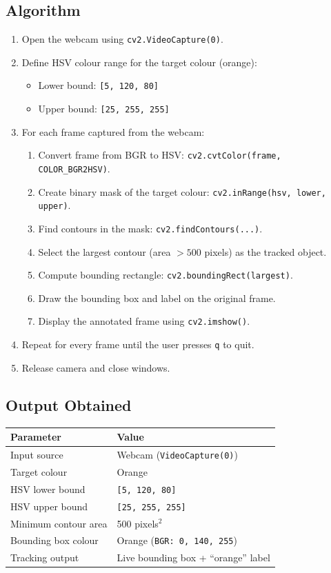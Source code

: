 \documentclass[12pt,a4paper]{article}
\begin{document}
\subsection*{Algorithm}
\begin{enumerate}[leftmargin=*, label=\arabic*.]
  \item Open the webcam using \texttt{cv2.VideoCapture(0)}.
  \item Define HSV colour range for the target colour (orange):
    \begin{itemize}
      \item Lower bound: \texttt{[5, 120, 80]}
      \item Upper bound: \texttt{[25, 255, 255]}
    \end{itemize}
  \item For each frame captured from the webcam:
    \begin{enumerate}[label=\alph*.]
      \item Convert frame from BGR to HSV: \texttt{cv2.cvtColor(frame, COLOR\_BGR2HSV)}.
      \item Create binary mask of the target colour: \texttt{cv2.inRange(hsv, lower, upper)}.
      \item Find contours in the mask: \texttt{cv2.findContours(...)}.
      \item Select the largest contour (area $> 500$ pixels) as the tracked object.
      \item Compute bounding rectangle: \texttt{cv2.boundingRect(largest)}.
      \item Draw the bounding box and label on the original frame.
      \item Display the annotated frame using \texttt{cv2.imshow()}.
    \end{enumerate}
  \item Repeat for every frame until the user presses \texttt{q} to quit.
  \item Release camera and close windows.
\end{enumerate}

\subsection*{Output Obtained}

\begin{center}
\begin{tabular}{ll}
\toprule
\textbf{Parameter} & \textbf{Value} \\
\midrule
Input source          & Webcam (\texttt{VideoCapture(0)}) \\
Target colour         & Orange \\
HSV lower bound       & \texttt{[5, 120, 80]} \\
HSV upper bound       & \texttt{[25, 255, 255]} \\
Minimum contour area  & 500 pixels$^2$ \\
Bounding box colour   & Orange (\texttt{BGR: 0, 140, 255}) \\
Tracking output       & Live bounding box + ``orange'' label \\
\bottomrule
\end{tabular}
\end{center}
\end{document}
